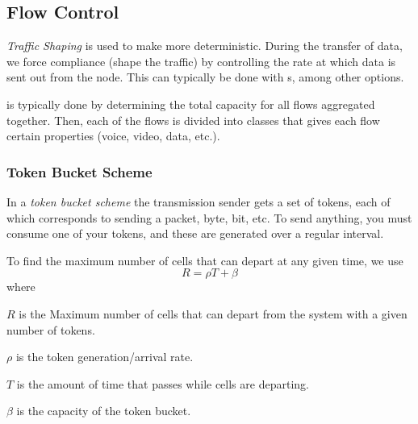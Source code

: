 \subsection{Flow Control}\label{subsec:Flow_Control}

\begin{definition}\label{def:Traffic_Shaping}
  \emph{Traffic Shaping} is used to make  more deterministic.
  During the transfer of data, we force compliance (shape the traffic) by controlling the rate at which data is sent out from the node.
  This can typically be done with s, among other options.
\end{definition}

 is typically done by determining the total capacity for all flows aggregated together.
Then, each of the flows is divided into classes that gives each flow certain properties (voice, video, data, etc.).

\begin{algorithm}[H]
  \DontPrintSemicolon{}
  \BlankLine{}

\end{algorithm}

\subsubsection{Token Bucket Scheme}\label{subsubsec:Token_Bucket_Scheme}
\begin{definition}\label{def:Token_Bucket_Scheme}
  In a \emph{token bucket scheme} the transmission sender gets a set of tokens, each of which corresponds to sending a packet, byte, bit, etc.
  To send anything, you must consume one of your tokens, and these are generated over a regular interval.
\end{definition}

To find the maximum number of cells that can depart at any given time, we use 
\begin{equation}\label{eq:Token_Bucket_Max_Cells}
  R = \rho T + \beta
\end{equation}
where
\begin{description}[noitemsep]
\item $R$ is the Maximum number of cells that can depart from the system with a given number of tokens.
\item $\rho$ is the token generation/arrival rate.
\item $T$ is the amount of time that passes while cells are departing.
\item $\beta$ is the capacity of the token bucket.
\end{description}

